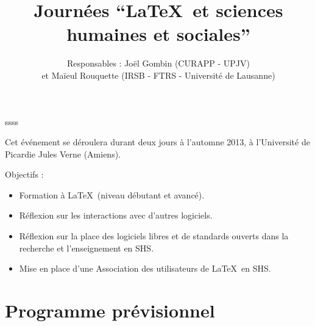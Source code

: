 \documentclass[11pt]{article}
\begin{document}
\title{Journées \enquote{\LaTeX\ et sciences humaines et sociales}}
\author{Responsables : Joël Gombin (CURAPP - UPJV) \\ et Maïeul Rouquette (IRSB - FTRS - Université de Lausanne)}
\maketitle

ssss

Cet événement se déroulera durant deux jours à l'automne 2013, à l'Université de Picardie Jules Verne (Amiens).

\vspace{12pt}


Objectifs :
\begin{itemize}
\item Formation à \LaTeX\ (niveau débutant et avancé).
\item Réflexion sur les interactions avec d'autres logiciels.
\item Réflexion sur la place des logiciels libres et de standards ouverts dans la recherche et l'enseignement en SHS.
\item Mise en place d'une Association des utilisateurs de \LaTeX\ en SHS.
\end{itemize}

\section{Programme prévisionnel}
\end{document}
